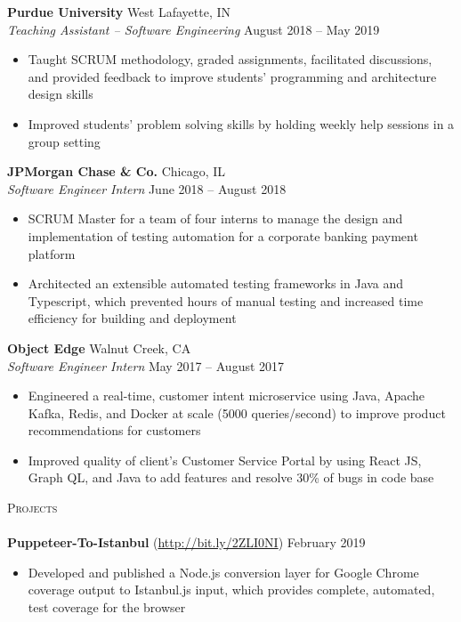 \documentclass[letterpaper, 10pt]{article}
\newcommand{\lineunder} {
    \vspace*{-8pt} \\
    \hspace*{-18pt} \hrulefill \\
}
\newcommand{\header} [1] {
    {
        \hspace*{-18pt}\vspace*{6pt}
        {\large\textsc{#1}}
    }
    \vspace*{-6pt} \lineunder
}
\begin{document}
\textbf{Purdue University} \hfill West Lafayette, IN\\
\textit{Teaching Assistant -- Software Engineering} \hfill August 2018 -- May 2019\\
\vspace{-1mm}
\begin{itemize} \itemsep 1pt
    \item Taught SCRUM methodology, graded assignments, facilitated discussions, and provided feedback to improve students’ programming and architecture design skills
    \item Improved students' problem solving skills by holding weekly help sessions in a group setting
\end{itemize}

\textbf{JPMorgan Chase \& Co.} \hfill Chicago, IL\\
\textit{Software Engineer Intern} \hfill June 2018 -- August 2018\\
\vspace{-1mm}
\begin{itemize} \itemsep 1pt
    \item SCRUM Master for a team of four interns to manage the design and implementation of testing automation for a corporate banking payment platform
    \item Architected an extensible automated testing frameworks in Java and Typescript, which prevented hours of manual testing and increased time efficiency for building and deployment
\end{itemize}

\textbf{Object Edge} \hfill Walnut Creek, CA\\
\textit{Software Engineer Intern} \hfill May 2017 -- August 2017\\
\vspace{-1mm}
\begin{itemize} \itemsep 1pt
    \item Engineered a real-time, customer intent microservice using Java, Apache Kafka, Redis, and Docker at scale (5000 queries/second) to improve product recommendations for customers
    \item Improved quality of client’s Customer Service Portal by using React JS, Graph QL, and Java to add features and resolve 30\% of bugs in code base
\end{itemize}

\header{Projects}
{\textbf{Puppeteer-To-Istanbul}} (\href{http://bit.ly/2ZLI0NI}{http://bit.ly/2ZLI0NI}) \hfill February 2019\\
\vspace{-1mm}
\begin{itemize} \itemsep 1pt
    \item Developed and published a Node.js conversion layer for Google Chrome coverage output to Istanbul.js input, which provides complete, automated, test coverage for the browser
\end{itemize}
\vspace*{2mm}
\end{document}
